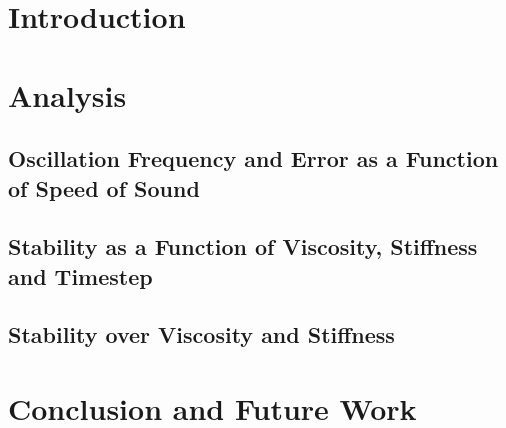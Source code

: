 \documentclass[oneside, a4paper]{book}
\begin{document}
\begin{titlepage}
\begin{center}
\begin{figure}[h!]
      \label{fig:title-image}
    \end{figure}
    \vfill
    \Large

    \vspace{5.2cm}
  \end{center}
\end{titlepage}

\tableofcontents
\newpage


\chapter{Introduction}







\chapter{Analysis}\label{chp:analysis}
\section{Oscillation Frequency and Error as a Function of Speed of Sound}
\section{Stability as a Function of Viscosity, Stiffness and Timestep}
\section{Stability over Viscosity and Stiffness}

\chapter{Conclusion and Future Work}



\printbibliography[
  heading=bibintoc,
  title={Bibliography}
]
\end{document}

